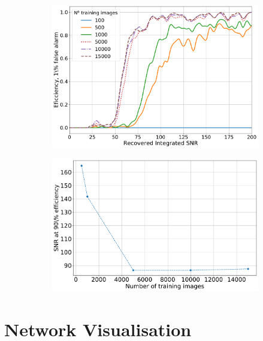 \begin{figure}[h]
	\begin{subfigure}[h]{0.5\textwidth}
		\includegraphics[width=\linewidth]{C4_cnn/o1_sens_with_trainnum_eff.pdf}
		\caption{}
	\end{subfigure}
	\begin{subfigure}[h]{0.5\textwidth}
		\includegraphics[width=\linewidth]{C4_cnn/o1_sens_with_trainnum.pdf}
		\caption{}
	\end{subfigure}
	\caption{}
	\label{machine:cnn:sens_size:o1_sens}
\end{figure}



\section{\label{cnn:networkvis}Network Visualisation}

